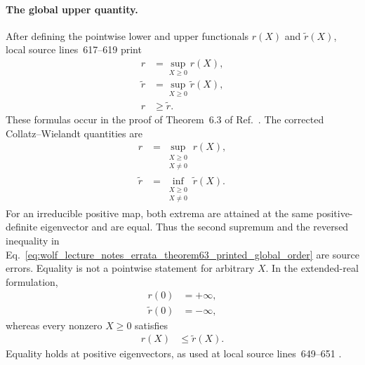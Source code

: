 \documentclass{article}
\begin{document}
\paragraph{The global upper quantity.}
After defining the pointwise lower and upper functionals $r(X)$ and
$\widetilde r(X)$, local source lines~617--619 print
\begin{align}
    r
        &=\sup_{X\geq0}r(X),
    \label{eq:wolf_lecture_notes_errata_theorem63_printed_lower_global}\\
    \widetilde r
        &=\sup_{X\geq0}\widetilde r(X),
    \label{eq:wolf_lecture_notes_errata_theorem63_printed_upper_global}\\
    r
        &\geq\widetilde r.
    \label{eq:wolf_lecture_notes_errata_theorem63_printed_global_order}
\end{align}
These formulas occur in the proof of Theorem~6.3 of
Ref.~\cite{Wolf2012Quantum}. The corrected Collatz--Wielandt quantities are
\begin{align}
    r
        &=\sup_{\substack{X\geq0\\X\neq0}}r(X),
    \label{eq:wolf_lecture_notes_errata_theorem63_correct_lower_global}\\
    \widetilde r
        &=\inf_{\substack{X\geq0\\X\neq0}}\widetilde r(X).
    \label{eq:wolf_lecture_notes_errata_theorem63_correct_upper_global}
\end{align}
For an irreducible positive map, both extrema are attained at the same
positive-definite eigenvector and are equal. Thus the second supremum and the
reversed inequality in
Eq.~\ref{eq:wolf_lecture_notes_errata_theorem63_printed_global_order} are
source errors. Equality is not a pointwise statement for arbitrary $X$. In the
extended-real formulation,
\begin{align}
    r(0)&=+\infty,
    \label{eq:wolf_lecture_notes_errata_theorem63_lower_at_zero}\\
    \widetilde r(0)&=-\infty,
    \label{eq:wolf_lecture_notes_errata_theorem63_upper_at_zero}
\end{align}
whereas every nonzero $X\geq0$ satisfies
\begin{align}
    r(X)
        &\leq\widetilde r(X).
    \label{eq:wolf_lecture_notes_errata_theorem63_pointwise_order}
\end{align}
Equality holds at positive eigenvectors, as used at local source
lines~649--651 \cite{Wolf2012Quantum}.
\end{document}
